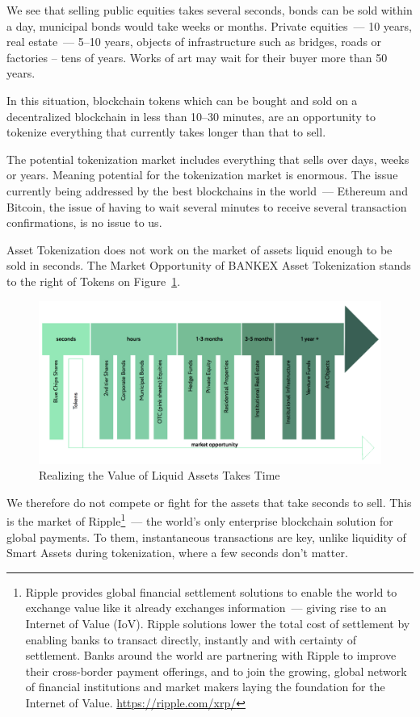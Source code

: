 \documentclass{article}
\begin{document}
\begin{multicols}{2}
We see that selling public equities takes several seconds, bonds can be sold within a day, municipal bonds would take weeks or months. Private equities~--- 10 years, real estate~--- 5--10 years, objects of infrastructure such as bridges, roads or factories – tens of years. Works of art may wait for their buyer more than 50 years. 

In this situation, blockchain tokens which can be bought and sold on a decentralized blockchain in less than 10--30 minutes, are an opportunity to tokenize everything that currently takes longer than that to sell. 

The potential tokenization market includes everything that sells over days, weeks or years. Meaning potential for the tokenization market is enormous. The issue currently being addressed by the best blockchains in the world~--- Ethereum and Bitcoin, the issue of having to wait several minutes to receive several transaction confirmations, is no issue to us. 

Asset Tokenization does not work on the market of assets liquid enough to be sold in seconds. The Market Opportunity of BANKEX Asset Tokenization stands to the right of Tokens on Figure~\ref{fig:liquidity-over-time}.

\begin{figure}
  \centering
  \includegraphics[width=\textwidth]{liquidity-over-time.png}
  \caption{Realizing the Value of Liquid Assets Takes Time}
  \label{fig:liquidity-over-time}
\end{figure}

We therefore do not compete or fight for the assets that take seconds to sell. This is the market of Ripple\footnote{Ripple provides global financial settlement solutions to enable the world to exchange value like it already exchanges information~--- giving rise to an Internet of Value (IoV). Ripple solutions lower the total cost of settlement by enabling banks to transact directly, instantly and with certainty of settlement. Banks around the world are partnering with Ripple to improve their cross-border payment offerings, and to join the growing, global network of financial institutions and market makers laying the foundation for the Internet of Value. \url{https://ripple.com/xrp/}}~--- the world’s only enterprise blockchain solution for global payments. To them, instantaneous transactions are key, unlike liquidity of Smart Assets during tokenization, where a few seconds don't matter.


\end{multicols}
\end{document}
